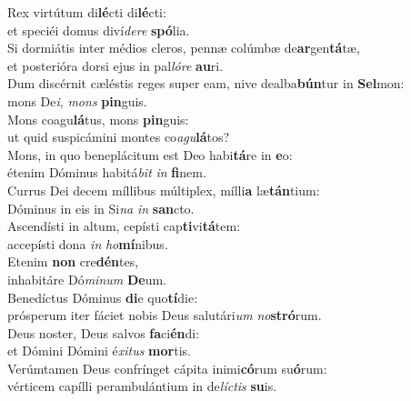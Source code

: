\oddverse Rex virtútum di\textbf{lé}cti di\textbf{lé}cti:~\*\\
\oddverse et speciéi domus diví\textit{de}\textit{re} \textbf{spó}lia.\\
\evenverse Si dormiátis inter médios cleros, pennæ colúmbæ de\textbf{ar}gen\textbf{tá}tæ,~\*\\
\evenverse et posterióra dorsi ejus in pal\textit{ló}\textit{re} \textbf{au}ri.\\
\oddverse Dum discérnit cæléstis reges super eam, nive dealba\textbf{bún}tur in \textbf{Sel}mon:~\*\\
\oddverse mons De\textit{i}, \textit{mons} \textbf{pin}guis.\\
\evenverse Mons coagu\textbf{lá}tus, mons \textbf{pin}guis:~\*\\
\evenverse ut quid suspicámini montes co\textit{a}\textit{gu}\textbf{lá}tos?\\
\oddverse Mons, in quo beneplácitum est Deo habi\textbf{tá}re in \textbf{e}o:~\*\\
\oddverse étenim Dóminus habitá\textit{bit} \textit{in} \textbf{fi}nem.\\
\evenverse Currus Dei decem míllibus múltiplex, mílli\textbf{a} læ\textbf{tán}tium:~\*\\
\evenverse Dóminus in eis in Si\textit{na} \textit{in} \textbf{san}cto.\\
\oddverse Ascendísti in altum, cepísti cap\textbf{ti}vi\textbf{tá}tem:~\*\\
\oddverse accepísti dona \textit{in} \textit{ho}\textbf{mí}nibus.\\
\evenverse Etenim \textbf{non} cre\textbf{dén}tes,~\*\\
\evenverse inhabitáre Dó\textit{mi}\textit{num} \textbf{De}um.\\
\oddverse Benedíctus Dóminus \textbf{di}e quo\textbf{tí}die:~\*\\
\oddverse prósperum iter fáciet nobis Deus salutári\textit{um} \textit{no}\textbf{stró}rum.\\
\evenverse Deus noster, Deus salvos \textbf{fa}ci\textbf{én}di:~\*\\
\evenverse et Dómini Dómini é\textit{xi}\textit{tus} \textbf{mor}tis.\\
\oddverse Verúmtamen Deus confrínget cápita inimi\textbf{có}rum su\textbf{ó}rum:~\*\\
\oddverse vérticem capílli perambulántium in de\textit{lí}\textit{ctis} \textbf{su}is.\\
